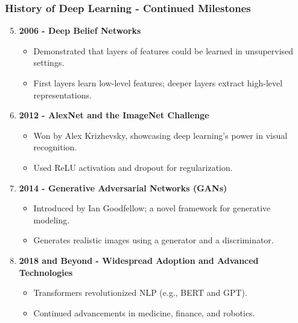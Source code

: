 \documentclass[aspectratio=169]{beamer}
\begin{document}
\begin{frame}[fragile]
    \frametitle{History of Deep Learning - Continued Milestones}
    \begin{enumerate}
        \setcounter{enumi}{4}
        \item \textbf{2006 - Deep Belief Networks}
        \begin{itemize}
            \item Demonstrated that layers of features could be learned in unsupervised settings.
            \item First layers learn low-level features; deeper layers extract high-level representations.
        \end{itemize}
        
        \item \textbf{2012 - AlexNet and the ImageNet Challenge}
        \begin{itemize}
            \item Won by Alex Krizhevsky, showcasing deep learning's power in visual recognition.
            \item Used ReLU activation and dropout for regularization.
        \end{itemize}
        
        \item \textbf{2014 - Generative Adversarial Networks (GANs)}
        \begin{itemize}
            \item Introduced by Ian Goodfellow; a novel framework for generative modeling.
            \item Generates realistic images using a generator and a discriminator.
        \end{itemize}

        \item \textbf{2018 and Beyond - Widespread Adoption and Advanced Technologies}
        \begin{itemize}
            \item Transformers revolutionized NLP (e.g., BERT and GPT).
            \item Continued advancements in medicine, finance, and robotics.
        \end{itemize}
    \end{enumerate}
\end{frame}
\end{document}
